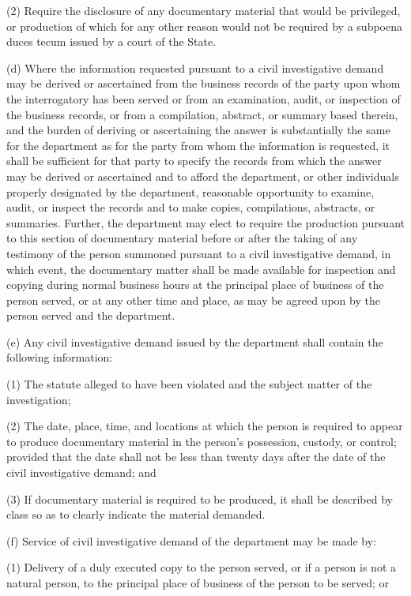      (2)  Require the disclosure of any documentary material that would be privileged, or production of which for any other reason would not be required by a subpoena duces tecum issued by a court of the State.

     (d)  Where the information requested pursuant to a civil investigative demand may be derived or ascertained from the business records of the party upon whom the interrogatory has been served or from an examination, audit, or inspection of the business records, or from a compilation, abstract, or summary based therein, and the burden of deriving or ascertaining the answer is substantially the same for the department as for the party from whom the information is requested, it shall be sufficient for that party to specify the records from which the answer may be derived or ascertained and to afford the department, or other individuals properly designated by the department, reasonable opportunity to examine, audit, or inspect the records and to make copies, compilations, abstracts, or summaries.  Further, the department may elect to require the production pursuant to this section of documentary material before or after the taking of any testimony of the person summoned pursuant to a civil investigative demand, in which event, the documentary matter shall be made available for inspection and copying during normal business hours at the principal place of business of the person served, or at any other time and place, as may be agreed upon by the person served and the department.

     (e)  Any civil investigative demand issued by the department shall contain the following information:

     (1)  The statute alleged to have been violated and the subject matter of the investigation;

     (2)  The date, place, time, and locations at which the person is required to appear to produce documentary material in the person's possession, custody, or control; provided that the date shall not be less than twenty days after the date of the civil investigative demand; and

     (3)  If documentary material is required to be produced, it shall be described by class so as to clearly indicate the material demanded.

     (f)  Service of civil investigative demand of the department may be made by:

     (1)  Delivery of a duly executed copy to the person served, or if a person is not a natural person, to the principal place of business of the person to be served; or

